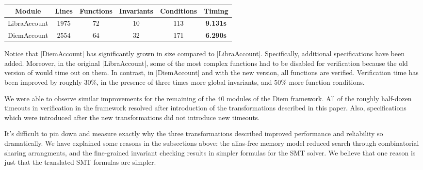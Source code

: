 {
\setlength{\tabcolsep}{6pt}
\vspace{2ex}
\begin{tabular*}{0.9\textwidth}{cccccc}
  \hline
  \hline
  Module & Lines & Functions & Invariants & Conditions & Timing \\
  \hline
  LibraAccount & 1975 & 72 & 10 & 113 & \textbf{9.131s} \\
  DiemAccount & 2554 & 64 & 32 & 171 & \textbf{6.290s} \\
  \hline
\end{tabular*}
\vspace{2ex}
}


\noindent Notice that |DiemAccount| has significantly grown in size compared to
|LibraAccount|.  Specifically, additional specifications have been
added. Moreover, in the original |LibraAccount|, some of the most complex
functions had to be disabled for verification because the old version of \MVP
would time out on them. In contrast, in |DiemAccount| and with the new version,
all functions are verified. Verification time has been improved by
roughly 30\%, in the presence of three times more global invariants, and 50\% more
function conditions.

We were able to observe similar improvements for the remaining of the 40 modules
of the Diem framework. All of the roughly half-dozen timeouts in verification in
the framework resolved after introduction of the transformations described in
this paper. Also, specifications which were introduced after the new
transformations did not introduce new timeouts.




It's difficult to pin down and measure exactly why the three transformations
described improved performance and reliability so dramatically.
We have explained some reasons in the subsections above: the alias-free memory model
reduced search through combinatorial sharing arrangments, and the
fine-grained invariant checking results in simpler formulas for the SMT solver.
We believe that one reason is just that the translated SMT formulas are simpler.

